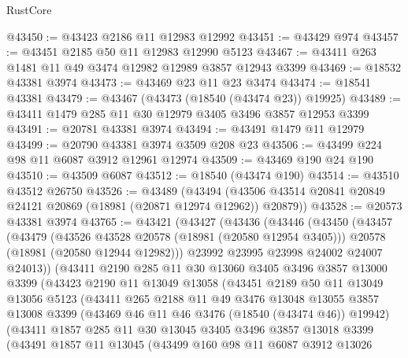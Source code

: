 \begin{lexlean}{RustCore}
\begin{coremodule}
@43450 := @43423 @2186 @11 @12983 @12992
@43451 := @43429 @974
@43457 := @43451 @2185 @50 @11 @12983 @12990 @5123
@43467 := @43411 @263 @1481 @11 @49 @3474 @12982 @12989 @3857 @12943 @3399
@43469 := @18532 @43381 @3974
@43473 := @43469 @23 @11 @23 @3474
@43474 := @18541 @43381
@43479 := @43467 (@43473 (@18540 (@43474 @23)) @19925)
@43489 := @43411 @1479 @285 @11 @30 @12979 @3405 @3496 @3857 @12953 @3399
@43491 := @20781 @43381 @3974
@43494 := @43491 @1479 @11 @12979
@43499 := @20790 @43381 @3974 @3509 @208 @23
@43506 := @43499 @224 @98 @11 @6087 @3912 @12961 @12974
@43509 := @43469 @190 @24 @190
@43510 := @43509 @6087
@43512 := @18540 (@43474 @190)
@43514 := @43510 @43512 @26750
@43526 := @43489
    (@43494 (@43506 @43514 @20841 @20849 @24121 @20869 (@18981 (@20871 @12974 @12962)) @20879))
@43528 := @20573 @43381 @3974
@43765 := @43421
    (@43427
      (@43436
        (@43446
          (@43450
            (@43457
              (@43479
                (@43526 @43528 @20578 (@18981 (@20580 @12954 @3405)))
                @20578
                (@18981 (@20580 @12944 @12982)))
              @23992
              @23995
              @23998
              @24002
              @24007
              @24013))
          (@43411
            @2190
            @285
            @11
            @30
            @13060
            @3405
            @3496
            @3857
            @13000
            @3399
            (@43423
              @2190
              @11
              @13049
              @13058
              (@43451
                @2189
                @50
                @11
                @13049
                @13056
                @5123
                (@43411
                  @265
                  @2188
                  @11
                  @49
                  @3476
                  @13048
                  @13055
                  @3857
                  @13008
                  @3399
                  (@43469 @46 @11 @46 @3476 (@18540 (@43474 @46)) @19942)
                  (@43411
                    @1857
                    @285
                    @11
                    @30
                    @13045
                    @3405
                    @3496
                    @3857
                    @13018
                    @3399
                    (@43491
                      @1857
                      @11
                      @13045
                      (@43499
                        @160
                        @98
                        @11
                        @6087
                        @3912
                        @13026

\end{coremodule}
\end{lexlean}
